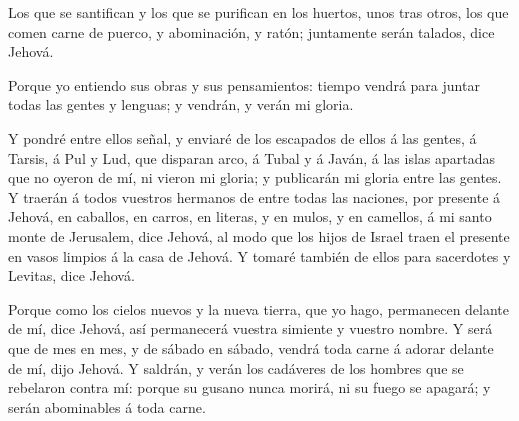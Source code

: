  Los que se santifican y los que se purifican en los
huertos, unos tras otros, los que comen carne de puerco, y abominación,
y ratón; juntamente serán talados, dice Jehová.

 Porque yo entiendo sus obras y sus pensamientos: tiempo
vendrá para juntar todas las gentes y lenguas; y vendrán, y verán mi
gloria.

 Y pondré entre ellos señal, y enviaré de los escapados de
ellos á las gentes, á Tarsis, á Pul y Lud, que disparan arco, á Tubal y
á Javán, á las islas apartadas que no oyeron de mí, ni vieron mi gloria;
y publicarán mi gloria entre las gentes.  Y traerán á todos
vuestros hermanos de entre todas las naciones, por presente á Jehová, en
caballos, en carros, en literas, y en mulos, y en camellos, á mi santo
monte de Jerusalem, dice Jehová, al modo que los hijos de Israel traen
el presente en vasos limpios á la casa de Jehová.  Y tomaré
también de ellos para sacerdotes y Levitas, dice Jehová.

 Porque como los cielos nuevos y la nueva tierra, que yo
hago, permanecen delante de mí, dice Jehová, así permanecerá vuestra
simiente y vuestro nombre.  Y será que de mes en mes, y de
sábado en sábado, vendrá toda carne á adorar delante de mí, dijo Jehová.
 Y saldrán, y verán los cadáveres de los hombres que se
rebelaron contra mí: porque su gusano nunca morirá, ni su fuego se
apagará; y serán abominables á toda carne.
